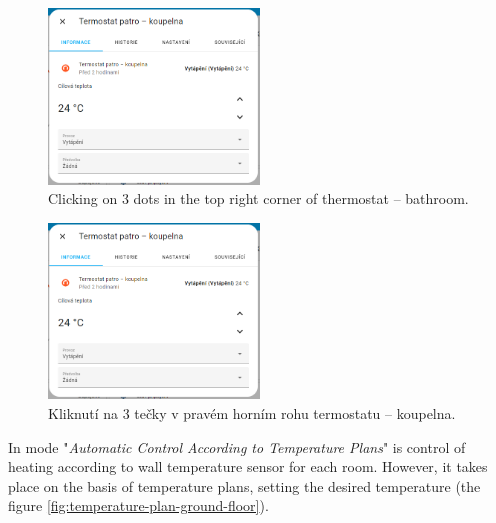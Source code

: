 \begin{English}
\begin{figure}[H]
    \centering
    \includegraphics[width=0.5\textwidth]{pictures/czech/software/click-thermostat.png}
    \caption{Clicking on 3 dots in the top right corner of thermostat – bathroom.}
    \label{fig:click-thermostat}
\end{figure}
\end{English}

\begin{Czech}
\begin{figure}[H]
    \centering
    \includegraphics[width=0.5\textwidth]{pictures/czech/software/click-thermostat.png}
    \caption{Kliknutí na 3 tečky v pravém horním rohu termostatu – koupelna.}
    \label{fig:click-thermostat}
\end{figure}
\end{Czech}


\begin{English}
\end{English}

\begin{Czech}
\end{Czech}


\begin{English}
In mode "\textit{Automatic Control According to Temperature Plans}" is control of heating according to wall temperature sensor for each room. However, it takes place on the basis of temperature plans, setting the desired temperature (the figure \ref{fig:temperature-plan-ground-floor}).
\end{English}

